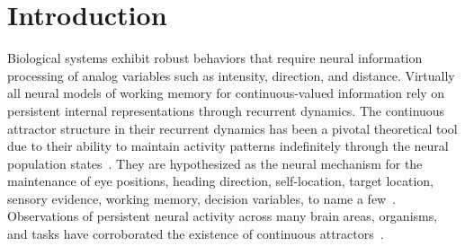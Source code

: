 \documentclass{article} %
\newcounter{ct}
\theoremstyle{definition}
\theoremstyle{remark}
\renewcommand{\cite}{\citep}
\begin{document}
\section{Introduction}
Biological systems exhibit robust behaviors that require neural information processing of analog variables such as intensity, direction, and distance.
Virtually all neural models of working memory for continuous-valued information rely on persistent internal representations through recurrent dynamics.
The continuous attractor structure in their recurrent dynamics has been a pivotal theoretical tool due to their ability to maintain activity patterns indefinitely through the neural population states~\cite{vyas2020,Dayan2001,Khona2022}.
They are hypothesized as the neural mechanism for the maintenance of eye positions, heading direction, self-location, target location, sensory evidence, working memory, decision variables, to name a few~\cite{seung1996,Seung2000,Romo1999}.
Observations of persistent neural activity across many brain areas, organisms, and tasks have corroborated the existence of continuous attractors~\cite{Romo1999,Noorman2022,Nair2023}.


\end{document}
